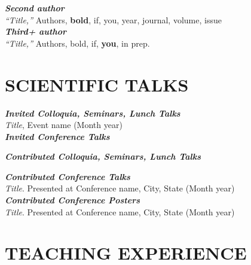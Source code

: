 \documentclass[11pt]{res} %
\newcommand{\titlegap}{5pt} %
\newcommand{\sectgap}{0.05in} %
\newcommand{\paragap}{-5pt}
\begin{document}
\begin{resume}
\vspace{\paragap}
{\bf \textit{Second author}}\\
\textit{``Title,''} Authors, {\bf bold}, if, you, year, journal, volume, issue\\

\vspace{\paragap}
{\bf \textit{Third+ author}}\\
\textit{``Title,''} Authors, bold, if, {\bf you}, in prep. \\


\vspace{\sectgap} 



\section{SCIENTIFIC TALKS}

\vspace{\titlegap}

{\bf \textit{Invited Colloquia, Seminars, Lunch Talks}}\\
\textit{Title}, Event name (Month  year) \\

{\bf \textit{Invited Conference Talks}}

{\bf \textit{Contributed Colloquia, Seminars, Lunch Talks}}


{\bf \textit{Contributed Conference Talks}}\\
\textit{Title}. Presented at Conference name, City, State (Month year) \\

{\bf \textit{Contributed Conference Posters}}\\
\textit{Title}. Presented at Conference name, City, State (Month year) \\

\vspace{\sectgap} %


\section{TEACHING EXPERIENCE}


\end{resume}
\end{document}
